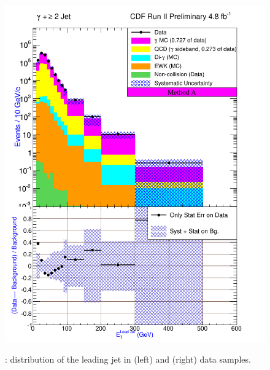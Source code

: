 \documentclass[11pt]{article}
\begin{document}
\begin{figure}[h!]
{ \includegraphics[scale=\resultsHistScale,keepaspectratio=true]{./g30jet_MtdA_plot2_Et_j1.pdf}
}
 \caption{: \et distribution of the leading jet in \phoonejet (left) and \photwojet (right) data samples.}
 \label{fig:Result_MtdA_gj1_JetEt}
\end{figure}
\end{document}
